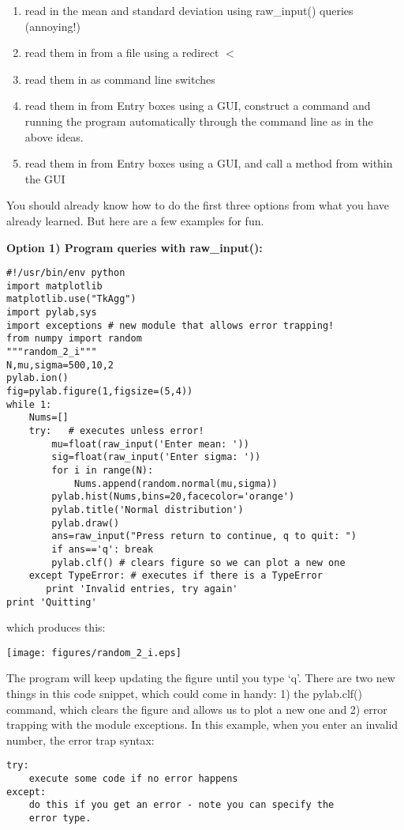 {{\begin{enumerate}
\item  read in the mean and standard deviation using raw\_input() queries (annoying!)
\item   read them in from a file using a redirect $<$
\item   read them in as command line switches
\item   read them in from Entry boxes using a GUI, construct a command and running the program automatically through the command line as in the above ideas.  
\item  read them in from Entry boxes using a GUI, and call a method from within the GUI
\end{enumerate}

You should already know how to do the first three options from what you have already learned.  But here are a few examples for fun.  

{\bf \noindent Option 1) Program queries with raw\_input():}

{\singlespacing \color{blue} \begin{verbatim}
#!/usr/bin/env python
import matplotlib
matplotlib.use("TkAgg")
import pylab,sys
import exceptions # new module that allows error trapping!
from numpy import random
"""random_2_i"""
N,mu,sigma=500,10,2
pylab.ion()
fig=pylab.figure(1,figsize=(5,4))
while 1:
    Nums=[]
    try:   # executes unless error!
        mu=float(raw_input('Enter mean: '))
        sig=float(raw_input('Enter sigma: '))
        for i in range(N):
            Nums.append(random.normal(mu,sigma))
        pylab.hist(Nums,bins=20,facecolor='orange')
        pylab.title('Normal distribution')
        pylab.draw()
        ans=raw_input("Press return to continue, q to quit: ")
        if ans=='q': break
        pylab.clf() # clears figure so we can plot a new one
    except TypeError: # executes if there is a TypeError
       print 'Invalid entries, try again'
print 'Quitting'
\end{verbatim}}
}
 which produces this:   
 
 \texttt{[image: figures/random\_2\_i.eps]} 
   
   The program will keep updating the figure until you type 
  `q'.    There are two new things in this code snippet, which could come in handy:  1) the {\color{blue}pylab.clf()} command, which clears the figure and allows us to plot a new one and 2) error trapping with the module {\color{blue}exceptions}.   In this example, when you enter an invalid number, the error trap syntax:  
  {\singlespacing \color{blue} \begin{verbatim}
try:
    execute some code if no error happens
except:
    do this if you get an error - note you can specify the
    error type.
\end{verbatim}}

}
